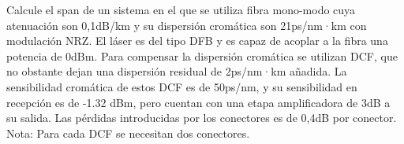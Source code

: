 \begin{exercise}[10]
	Calcule el span de un sistema en el que se utiliza fibra mono-modo cuya atenuación son 0,1dB/km y su dispersión cromática son 21ps/nm·km con modulación NRZ. El láser es del tipo DFB y es capaz de acoplar a la fibra una potencia de 0dBm. Para compensar la dispersión cromática se utilizan DCF, que no obstante dejan una dispersión residual de 2ps/nm·km añadida. La sensibilidad cromática de estos DCF es de 50ps/nm, y su sensibilidad en recepción es de -1.32 dBm, pero cuentan con una etapa amplificadora de 3dB a su salida. Las pérdidas introducidas por los conectores es de 0,4dB por conector.\\
Nota: Para cada DCF se necesitan dos conectores.
\end{exercise}